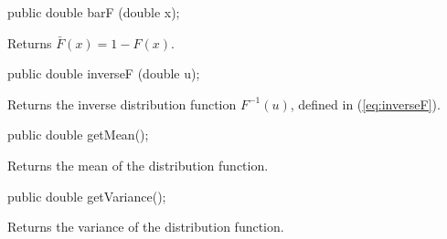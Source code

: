 \begin{code}

   public double barF (double x);
\end{code}
\begin{tabb} Returns $\bar F(x) = 1 - F(x)$.
\end{tabb}
\begin{htmlonly}
\end{htmlonly}
\begin{code}

   public double inverseF (double u);
\end{code}
\begin{tabb}  Returns the inverse distribution function
   $F^{-1}(u)$, defined in (\ref{eq:inverseF}).
\end{tabb}
\begin{htmlonly}
\end{htmlonly}
\begin{code}

   public double getMean();
\end{code}
\begin{tabb}   Returns the mean of the distribution function.
\end{tabb}
\begin{code}

   public double getVariance();
\end{code}
\begin{tabb}   Returns the variance of the distribution function.
\end{tabb}
